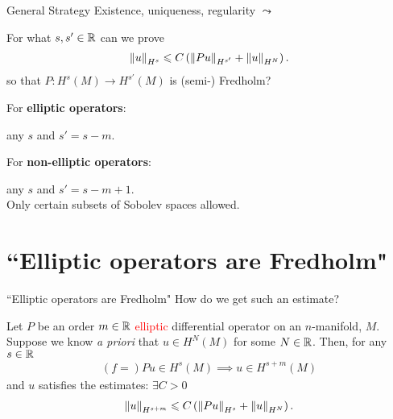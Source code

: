\documentclass{beamer}
\begin{document}
\begin{frame}{General Strategy}
Existence, uniqueness, regularity $\leadsto$ 
\begin{block}{} 
     For what $s, s' \in \R$ can we prove 
     \begin{align*}
     \norm[u]_{H^s} \leq C \brac{\norm[Pu]_{H^{s'}} + \norm[u]_{H^{N}}}. 
     \end{align*}  
     so that $P: H^s(M) \to H^{s'}(M)$ is (semi-) Fredholm? 
\end{block}

For \textbf{elliptic operators}: 
\begin{center}
    any $s$ and $s' = s - m$. 
\end{center}
For \textbf{non-elliptic operators}: 
\begin{center}
    any $s$ and $s' = s - m + 1$. \\
    Only certain subsets of Sobolev spaces allowed. 
\end{center}

\end{frame} 


\section{``Elliptic operators are Fredholm"} 
\begin{frame}{``Elliptic operators are Fredholm"} 
How do we get such an estimate? 

\begin{theorem}
    Let $P$ be an order $m \in \R$ \textcolor<2->{red}{ elliptic}
    differential operator on an $n$-manifold, $M$. Suppose we know \textit{a priori} that $u \in H^{N}(M)$ for some $N \in \R$. Then, for any $s \in \R$
    \begin{align*}
    (f = ) Pu \in H^{s}(M) \implies u \in H^{s + m}(M)
    \end{align*}
    and $u$ satisfies the estimates: $\exists C > 0$
    \begin{align*}
    \norm[u]_{H^{s + m}} \leq C \brac{\norm[Pu]_{H^s} + \norm[u]_{H^N}}. 
    \end{align*}
\end{theorem}

\end{frame} 
\end{document}
